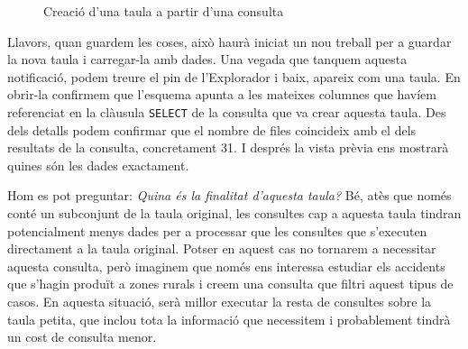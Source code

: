 \documentclass[12pt,longbibliography]{article}
\theoremstyle{definition}
\theoremstyle{remark}
\begin{document}
\begin{figure}[h!]
\par
{}%
\hfill
{}%
\par

\caption{Creació d'una taula a partir d'una consulta}
\label{fig:bq17}
\end{figure}



Llavors, quan guardem les coses, això haurà iniciat un nou treball per a guardar la nova taula i carregar-la amb dades. Una vegada que tanquem aquesta notificació, podem treure el pin de l'Explorador i baix, apareix com una taula. En obrir-la confirmem que l'esquema apunta a les mateixes columnes que havíem referenciat en la clàusula \verb|SELECT| de la consulta que va crear aquesta taula. Des dels detalls podem confirmar que el nombre de files coincideix amb el dels resultats de la consulta, concretament 31. I després la vista prèvia ens mostrarà quines són les dades exactament. 



Hom es pot preguntar: \textit{Quina és la finalitat d'aquesta taula?} Bé, atès que només conté un subconjunt de la taula original, les consultes cap a aquesta taula tindran potencialment menys dades per a processar que les consultes que s'executen directament a la taula original. Potser en aquest cas no tornarem a necessitar aquesta consulta, però imaginem que només ens interessa estudiar els accidents que s'hagin produït a zones rurals i creem una consulta que filtri aquest tipus de casos. En aquesta situació, serà millor executar la resta de consultes sobre la taula petita, que inclou tota la informació que necessitem i probablement tindrà un cost de consulta menor.
\end{document}
